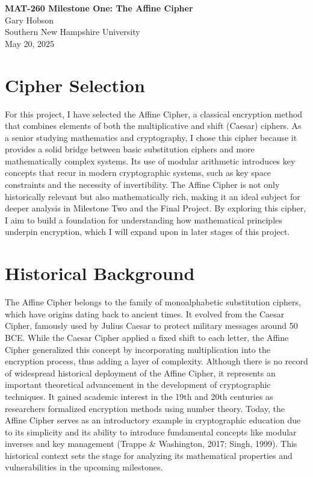 \documentclass[12pt]{article}
\begin{document}
\begin{center}
    \textbf{\Large MAT-260 Milestone One: The Affine Cipher} \\
    \vspace{0.5cm}
    Gary Hobson \\
    Southern New Hampshire University \\
    May 20, 2025
\end{center}

\thispagestyle{empty}

\clearpage

\section*{Cipher Selection}
For this project, I have selected the Affine Cipher, a classical encryption method that combines elements of both the multiplicative and shift (Caesar) ciphers. As a senior studying mathematics and cryptography, I chose this cipher because it provides a solid bridge between basic substitution ciphers and more mathematically complex systems. Its use of modular arithmetic introduces key concepts that recur in modern cryptographic systems, such as key space constraints and the necessity of invertibility. The Affine Cipher is not only historically relevant but also mathematically rich, making it an ideal subject for deeper analysis in Milestone Two and the Final Project. By exploring this cipher, I aim to build a foundation for understanding how mathematical principles underpin encryption, which I will expand upon in later stages of this project.

\section*{Historical Background}
The Affine Cipher belongs to the family of monoalphabetic substitution ciphers, which have origins dating back to ancient times. It evolved from the Caesar Cipher, famously used by Julius Caesar to protect military messages around 50 BCE. While the Caesar Cipher applied a fixed shift to each letter, the Affine Cipher generalized this concept by incorporating multiplication into the encryption process, thus adding a layer of complexity. Although there is no record of widespread historical deployment of the Affine Cipher, it represents an important theoretical advancement in the development of cryptographic techniques. It gained academic interest in the 19th and 20th centuries as researchers formalized encryption methods using number theory. Today, the Affine Cipher serves as an introductory example in cryptographic education due to its simplicity and its ability to introduce fundamental concepts like modular inverses and key management (Trappe \& Washington, 2017; Singh, 1999). This historical context sets the stage for analyzing its mathematical properties and vulnerabilities in the upcoming milestones.
\end{document}
